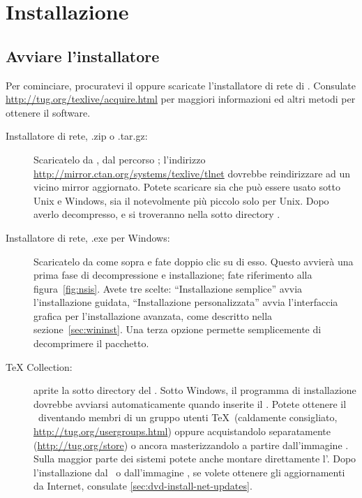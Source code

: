 \documentclass{article}
\begin{document}
\section{Installazione}
\label{sec:install}

\subsection{Avviare l'installatore}
\label{sec:inst-start}

Per cominciare, procuratevi il \DVD{} \TK{} oppure scaricate
l'installatore di rete di \TL. Consulate
\url{http://tug.org/texlive/acquire.html} per maggiori informazioni ed
altri metodi per ottenere il software.

\begin{description} \item [Installatore di rete, .zip o .tar.gz:]
Scaricatelo da \CTAN, dal percorso ;
l'indirizzo \url{http://mirror.ctan.org/systems/texlive/tlnet}
dovrebbe reindirizzare ad un vicino mirror aggiornato. Potete
scaricare sia  che può essere usato sotto
Unix e Windows, sia il notevolmente più piccolo
 solo per Unix. Dopo averlo
decompresso,  e
 si troveranno nella sotto
directory .

\item [Installatore di rete, .exe per Windows:] Scaricatelo da \CTAN{}
come sopra e fate doppio clic su di esso. Questo avvierà una prima fase
di decompressione e installazione; fate riferimento alla
figura~\ref{fig:nsis}. Avete tre scelte: ``Installazione semplice'' avvia
l'installazione guidata, ``Installazione personalizzata'' avvia
l'interfaccia grafica per l'installazione avanzata, come descritto nella
sezione~\ref{sec:wininst}. Una terza opzione permette semplicemente di
decomprimere il pacchetto.

\item [\DVD{} \TeX{} Collection:] aprite la sotto directory
 del \DVD. Sotto Windows, il programma di installazione
dovrebbe avviarsi automaticamente quando inserite il \DVD. Potete ottenere il
\DVD\ diventando membri di un gruppo utenti \TeX\ (caldamente consigliato,
\url{http://tug.org/usergroups.html}) oppure acquistandolo separatamente
(\url{http://tug.org/store}) o ancora masterizzandolo a partire
dall'immagine \ISO. Sulla maggior parte dei sistemi potete anche montare
direttamente l'\ISO. Dopo l'installazione dal \DVD\ o dall'immagine \ISO, se
volete ottenere gli aggiornamenti da Internet, consulate
\ref{sec:dvd-install-net-updates}.

\end{description}
\end{document}
